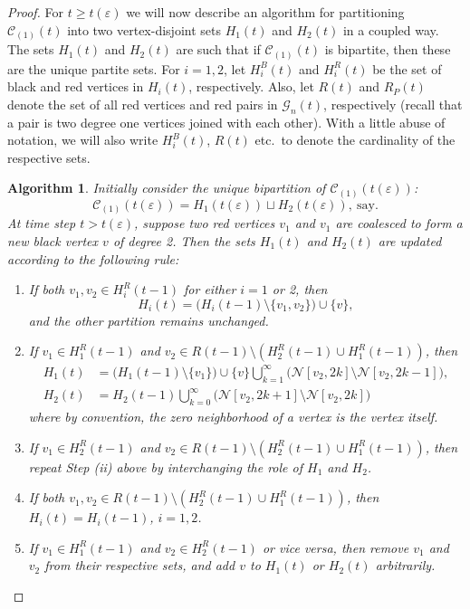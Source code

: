 \documentclass[11pt,a4paper, reqno]{article}
\numberwithin{equation}{section}
\numberwithin{equation}{section}
\def\sss{\scriptscriptstyle}
\newcommand{\1}{\ensuremath{\mathbbm{1}}}
\newcommand{\cG}{\mathcal{G}}
\newcommand{\sCL}{\mathscr{C}_{\sss (1)}}
\newtheorem{algo}{Algorithm}
\numberwithin{equation}{section}
\numberwithin{theorem}{section}
\begin{document}
\begin{proof}
For $t\geq t(\varepsilon)$ we will now describe an algorithm for partitioning $\sCL(t)$ into two vertex-disjoint sets $H_1(t)$ and $H_2(t)$ in a coupled way.
The sets $H_1(t)$ and $H_2(t)$ are such that if $\sCL(t)$ is bipartite, then these are the unique partite sets.
For $i=1,2$, let $H_i^B(t)$ and $H_i^R(t)$ be the set of black and red vertices in $H_i(t)$, respectively. Also, let $R(t)$ and $R_P(t)$ denote the set of all red vertices and red pairs in $\cG_n(t)$, respectively
(recall that a pair is two degree one vertices joined with each other).
 With a little abuse of notation, we will also write $H_i^B(t)$, $R(t)$ etc.~to denote the cardinality of the respective sets.
\begin{algo}\label{algo:partition}
\normalfont
Initially consider the unique bipartition of $\sCL(t(\varepsilon))$:
$$\sCL(t(\varepsilon)) = H_1(t(\varepsilon))\sqcup H_2(t(\varepsilon)),\ \mathrm{say}.$$ 
At time step $t> t(\varepsilon)$, suppose two red vertices $v_1$ and $v_1$ are coalesced to form a new black vertex $v$ of degree 2. 
Then the sets $H_1(t)$ and $H_2(t)$ are updated according to the following rule:
\begin{enumerate}[{\normalfont (i)}]
\item If both $v_1, v_2\in H_i^R(t-1)$ for either $i=1$ or 2, then 
$$H_i(t)= \big(H_i(t-1)\setminus \{v_1,v_2\}\big)\cup \{v\},$$
and the other partition remains unchanged.
\item If $v_1\in H_1^R(t-1)$ and $v_2\in R(t-1)\setminus (H_2^R(t-1)\cup H_1^R(t-1))$, then 
\begin{align*}
H_1(t) &= \Big(H_1(t-1)\setminus \{v_1\}\Big)
\cup\{v\}\bigcup_{k=1}^\infty \Big(\mathcal{N}[v_2,2k]\setminus \mathcal{N}[v_2,2k-1]\Big),\\  
H_2(t) &= H_2(t-1)\bigcup_{k=0}^\infty \Big(\mathcal{N}[v_2,2k+1]\setminus \mathcal{N}[v_2,2k]\Big)
\end{align*}
where by convention, the zero neighborhood of a vertex is the vertex itself.
\item If $v_1\in H_2^R(t-1)$ and $v_2\in R(t-1)\setminus (H_2^R(t-1)\cup H_1^R(t-1))$, then repeat Step (ii) above by interchanging the role of $H_1$ and $H_2$.
\item If both $v_1, v_2\in R(t-1)\setminus (H_2^R(t-1)\cup H_1^R(t-1))$, then $H_i(t) = H_i(t-1)$, $i=1,2$.
\item If $v_1\in H_1^R(t-1)$ and $ v_2\in H_2^R(t-1)$ or vice versa, then remove $v_1$ and $v_2$ from their respective sets, and add $v$ to $H_1(t)$ or $H_2(t)$ arbitrarily. 
\end{enumerate}
\end{algo}
\vspace{.25cm}


\end{proof}
\end{document}
